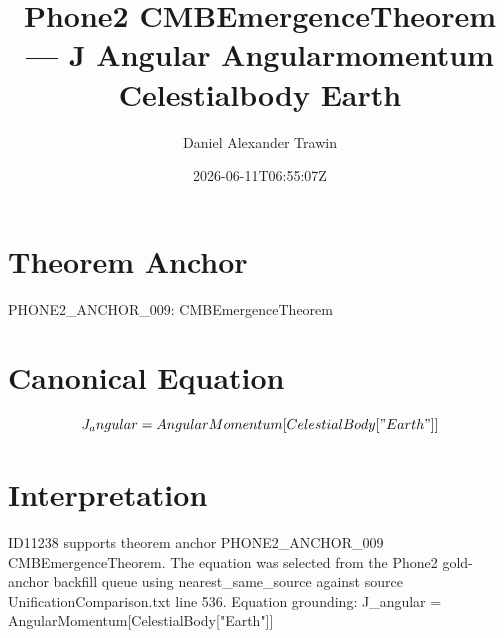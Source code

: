 \documentclass[11pt]{article}
\title{Phone2 CMBEmergenceTheorem — J Angular Angularmomentum Celestialbody Earth}
\author{Daniel Alexander Trawin}
\date{2026-06-11T06:55:07Z}
\begin{document}
\maketitle
\section*{Theorem Anchor}
PHONE2_ANCHOR_009: CMBEmergenceTheorem
\section*{Canonical Equation}
\[
J_angular = AngularMomentum[CelestialBody["Earth"]]
\]
\section*{Interpretation}
ID11238 supports theorem anchor PHONE2_ANCHOR_009 CMBEmergenceTheorem. The equation was selected from the Phone2 gold-anchor backfill queue using nearest_same_source against source UnificationComparison.txt line 536. Equation grounding: J_angular = AngularMomentum[CelestialBody["Earth"]]
\end{document}
